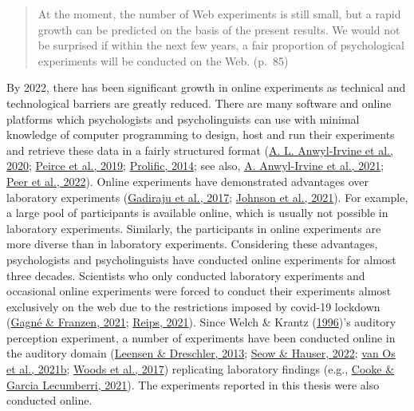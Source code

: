 \documentclass[a4paper, nobind]{templates/ociamthesis}
\begin{document}
\begin{quote}
At the moment, the number of Web experiments is still small, but a rapid growth can be predicted on the basis of the present results.
We would not be surprised if within the next few years, a fair proportion of psychological experiments will be conducted on the Web. (p.~85)
\end{quote}

By 2022, there has been significant growth in online experiments as technical and technological barriers are greatly reduced.
There are many software and online platforms which psychologists and psycholinguists can use with minimal knowledge of computer programming
to design, host and run their experiments and retrieve these data in a fairly structured format (\protect\hyperlink{ref-Anwylirvine2020}{A. L. Anwyl-Irvine et al., 2020}; \protect\hyperlink{ref-Peirce2019}{Peirce et al., 2019}; \protect\hyperlink{ref-Prolific}{Prolific, 2014}; see also, \protect\hyperlink{ref-Anwylirvine2021}{A. Anwyl-Irvine et al., 2021}; \protect\hyperlink{ref-Eyal2022}{Peer et al., 2022}).
Online experiments have demonstrated advantages over laboratory experiments (\protect\hyperlink{ref-Gadiraju2017}{Gadiraju et al., 2017}; \protect\hyperlink{ref-Johnson2021}{Johnson et al., 2021}).
For example, a large pool of participants is available online, which is usually not possible in laboratory experiments.
Similarly, the participants in online experiments are more diverse than in laboratory experiments.
Considering these advantages, psychologists and psycholinguists have conducted online experiments for almost three decades.
Scientists who only conducted laboratory experiments and occasional online experiments were forced to conduct their experiments almost exclusively on the web due to the restrictions imposed by covid-19 lockdown (\protect\hyperlink{ref-Gagne2021}{Gagné \& Franzen, 2021}; \protect\hyperlink{ref-Reips2021}{Reips, 2021}).
Since Welch \& Krantz (\protect\hyperlink{ref-Welch1996}{1996})'s auditory perception experiment, a number of experiments have been conducted online in the auditory domain (\protect\hyperlink{ref-Leensen2013}{Leensen \& Dreschler, 2013}; \protect\hyperlink{ref-Seow2022}{Seow \& Hauser, 2022}; \protect\hyperlink{ref-vanOs2021}{van Os et al., 2021b}; \protect\hyperlink{ref-Woods2017}{Woods et al., 2017}) replicating laboratory findings (e.g., \protect\hyperlink{ref-Cooke2021}{Cooke \& Garcia Lecumberri, 2021}).
The experiments reported in this thesis were also conducted online.
\end{document}

